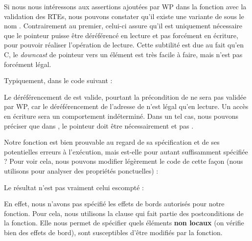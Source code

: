 Si nous nous intéressons aux assertions ajoutées par WP dans la fonction 
avec la validation des RTEs, nous pouvons constater qu'il existe une variante
de  sous le nom . Contrairement au premier,
celui-ci assure qu'il est uniquement nécessaire que le pointeur puisse
être déréférencé en lecture et pas forcément en écriture, pour pouvoir
réaliser l'opération de lecture. Cette subtilité est due au fait qu'en C, le
\textit{downcast} de pointeur vers un élément  est très facile à faire, mais
n'est pas forcément légal.



Typiquement, dans le code suivant :






Le déréférencement de  est valide, pourtant la précondition de 
ne sera pas validée par WP, car le déréférencement de l'adresse de 
n'est légal qu'en lecture. Un accès en écriture sera un comportement
indéterminé. Dans un tel cas, nous pouvons préciser que dans , le
pointeur  doit être nécessairement  et pas .





Notre fonction  est bien prouvable au regard de sa spécification et
de ses potentielles erreurs à l'exécution, mais est-elle pour autant
suffisamment spécifiée ? Pour voir cela, nous pouvons modifier légèrement le code
de cette façon (nous utilisons  pour analyser des propriétés
ponctuelles) :






Le résultat n'est pas vraiment celui escompté :





En effet, nous n'avons pas spécifié les effets de bords autorisés pour notre
fonction. Pour cela, nous utilisons la clause 
qui fait partie des postconditions de la fonction. Elle nous permet de spécifier
quels éléments \textbf{non locaux} (on vérifie bien des effets de bord), sont
susceptibles d'être modifiés par la fonction.



